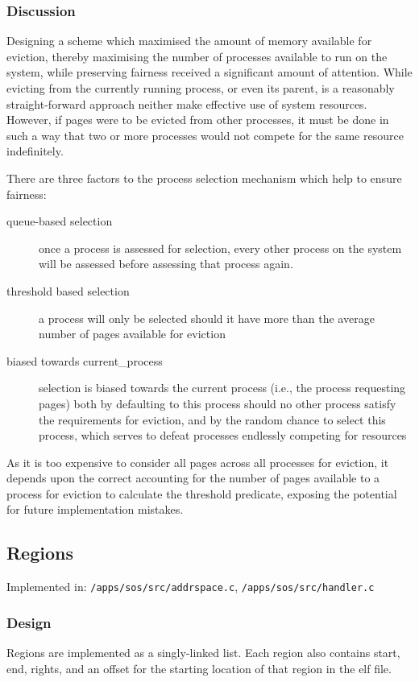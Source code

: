 \documentclass[a4paper,12pt]{article}
\begin{document}
\subsubsection{Discussion}
Designing a scheme which maximised the amount of memory available for
eviction, thereby maximising the number of processes available to run on the
system, while preserving fairness received a significant amount of attention.
While evicting from the currently running process, or even its parent, is a
reasonably straight-forward approach neither make effective use of system
resources.  However, if pages were to be evicted from other processes, it must
be done in such a way that two or more processes would not compete for the
same resource indefinitely.

There are three factors to the process selection mechanism which help to
ensure fairness:
\begin{description}
\item[queue-based selection] once a process is assessed for selection, every
  other process on the system will be assessed before assessing that process
  again.
\item[threshold based selection] a process will only be selected should it
  have more than the average number of pages available for eviction
\item[biased towards current\_process] selection is biased towards the current
  process (i.e., the process requesting pages) both by defaulting to this
  process should no other process satisfy the requirements for eviction, and
  by the random chance to select this process, which serves to defeat
  processes endlessly competing for resources
\end{description}

As it is too expensive to consider all pages across all processes for
eviction, it depends upon the correct accounting for the number of pages
available to a process for eviction to calculate the threshold predicate,
exposing the potential for future implementation mistakes.

\subsection{Regions}
Implemented in: \texttt{/apps/sos/src/addrspace.c}, \texttt{/apps/sos/src/handler.c}

\subsubsection{Design}
Regions are implemented as a singly-linked list.  Each region also contains
start, end, rights, and an offset for the starting location of that region in
the elf file.
\end{document}

